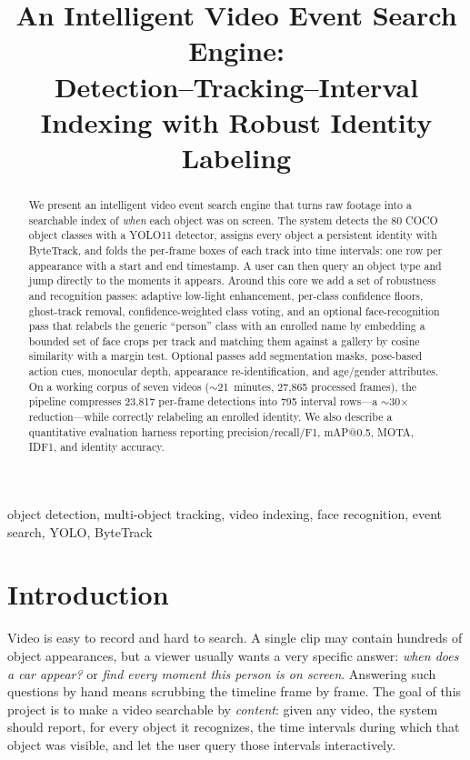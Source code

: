 \documentclass[conference]{IEEEtran}
\begin{document}
\title{An Intelligent Video Event Search Engine:\\
Detection--Tracking--Interval Indexing with Robust Identity Labeling}

\author{
}

\maketitle

\begin{abstract}
We present an intelligent video event search engine that turns raw
footage into a searchable index of \emph{when} each object was on
screen. The system detects the 80 COCO object classes with a YOLO11
detector, assigns every object a persistent identity with ByteTrack,
and folds the per-frame boxes of each track into time intervals: one
row per appearance with a start and end timestamp. A user can then
query an object type and jump directly to the moments it appears.
Around this core we add a set of robustness and recognition passes:
adaptive low-light enhancement, per-class confidence floors,
ghost-track removal, confidence-weighted class voting, and an optional
face-recognition pass that relabels the generic ``person'' class with
an enrolled name by embedding a bounded set of face crops per track and
matching them against a gallery by cosine similarity with a margin
test. Optional passes add segmentation masks, pose-based action cues,
monocular depth, appearance re-identification, and age/gender
attributes. On a working corpus of seven videos ($\sim$21~minutes,
27{,}865 processed frames), the pipeline compresses 23{,}817 per-frame
detections into 795 interval rows---a $\sim$30$\times$ reduction---while
correctly relabeling an enrolled identity. We also describe a
quantitative evaluation harness reporting precision/recall/F1,
mAP@0.5, MOTA, IDF1, and identity accuracy.
\end{abstract}

\begin{IEEEkeywords}
object detection, multi-object tracking, video indexing, face
recognition, event search, YOLO, ByteTrack
\end{IEEEkeywords}

\section{Introduction}
Video is easy to record and hard to search. A single clip may contain
hundreds of object appearances, but a viewer usually wants a very
specific answer: \emph{when does a car appear?} or \emph{find every
moment this person is on screen}. Answering such questions by hand
means scrubbing the timeline frame by frame. The goal of this project
is to make a video searchable by \emph{content}: given any video, the
system should report, for every object it recognizes, the time
intervals during which that object was visible, and let the user query
those intervals interactively.
\end{document}
